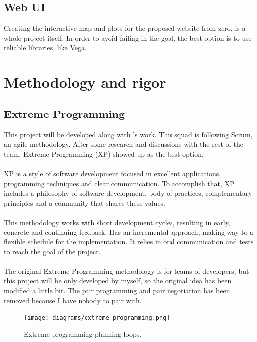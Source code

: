 \subsection{Web UI}

Creating the interactive map and plots for the proposed website from zero, is a whole project itself. In order to avoid failing in the \textit{} goal, the best option is to use reliable libraries, like Vega\cite{vega}.


\section{Methodology and rigor}

\subsection{Extreme Programming} \label{xp}

This project will be developed along with \squad's work. This squad is following Scrum, an agile methodology. After some research and discussions with the rest of the team, Extreme Programming (XP)\cite{xp} showed up as the best option. %
\\\\
XP is a style of software development focused in excellent applications, programming techniques and clear communication. To accomplish that, XP includes a philosophy of software development, body of practices, complementary principles and a community that shares these values.
\\\\
This methodology works with short development cycles, resulting in early, concrete and continuing feedback. Has an incremental approach, making way to a flexible schedule for the implementation. It relies in oral communication and tests to reach the goal of the project.
\\\\
The original Extreme Programming methodology is for teams of developers, but this project will be only developed by myself, so the original idea has been modified a little bit. The pair programming and pair negotiation has been removed because I have nobody to pair with.

\begin{figure}[H]
\centering
\texttt{[image: diagrams/extreme\_programming.png]}
\caption{Extreme programming planning loops.}
\end{figure}

